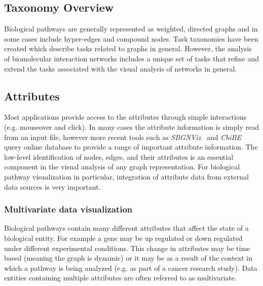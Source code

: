 \documentclass[journal]{vgtc}                %
\begin{document}
\subsection{Taxonomy Overview}

Biological pathways are generally represented as weighted, directed graphs and in some cases include hyper-edges and compound nodes.
Task taxonomies have been created which describe tasks related to graphs in general. However, the analysis of biomolecular interaction networks includes a unique set of tasks that refine and extend the tasks associated with the visual analysis of networks in general.

\subsection{Attributes}


Most applications provide access to the attributes through simple interactions (e.g. mouseover and click). In many cases the attribute information is simply read from an input file, however more recent tools such as \textit{SBGNViz}~\cite{SBGNViz2015} and \textit{ChiBE}\cite{Babur2010chibe} query online database to provide a range of important attribute information.
The low-level identification of nodes, edges, and their attributes is an essential component in the visual analysis of any graph representation. For biological pathway visualization in particular, integration of attribute data from external data sources is very important.

\subsubsection{Multivariate data visualization} %
Biological pathways  contain many different attributes that affect the state of a biological entity. 
For example a gene may be up regulated or down regulated under different experimental conditions. 
This change in attributes may be time based (meaning the graph is dynamic) or it may be as a result of the context in which a pathway is being analyzed (e.g. as part of a cancer research study).
Data entities containing multiple attributes are often referred to as multivariate.
\end{document}
